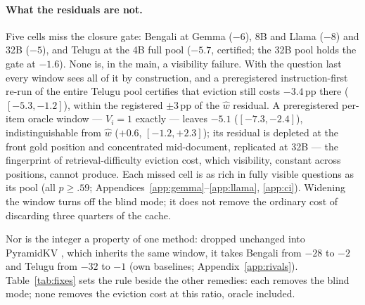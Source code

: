 \documentclass{article}
\begin{document}
\paragraph{What the residuals are not.}
Five cells miss the closure gate: Bengali at Gemma ($-6$), 8B and
Llama ($-8$) and 32B ($-5$), and Telugu at the 4B full pool ($-5.7$,
certified; the 32B pool holds the gate at $-1.6$). None is, in the
main, a visibility failure. With the question last every window sees all of
it by construction, and a preregistered instruction-first re-run of
the entire Telugu pool certifies that eviction still costs
$-3.4$\,pp there ($[-5.3,-1.2]$), within the registered $\pm3$\,pp of
the $\hat w$ residual. A preregistered per-item oracle window ---
$V_i{=}1$ exactly --- leaves $-5.1$ ($[-7.3,-2.4]$), indistinguishable
from $\hat w$ ($+0.6$, $[-1.2,+2.3]$); its residual is depleted at the
front gold position and concentrated mid-document, replicated at 32B
--- the fingerprint of retrieval-difficulty eviction cost, which
visibility, constant across positions, cannot produce. Each missed
cell is as rich in fully visible questions as its pool (all
$p \ge .59$; Appendices~\ref{app:gemma}--\ref{app:llama}, \ref{app:ci}).
Widening the window turns off the blind mode; it does not remove the
ordinary cost of discarding three quarters of the cache.

Nor is the integer a property of one method: dropped unchanged into
PyramidKV \citep{cai2024pyramidkv}, which inherits the same window,
it takes Bengali from $-28$ to $-2$ and Telugu from $-32$ to $-1$
(own baselines; Appendix~\ref{app:rivals}). Table~\ref{tab:fixes} sets
the rule beside the other remedies: each removes the blind mode; none
removes the eviction cost at this ratio, oracle included.
\end{document}
